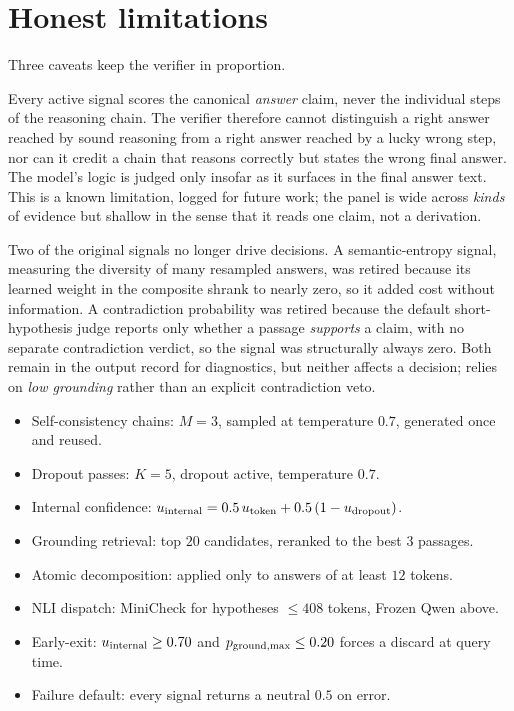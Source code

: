 \section{Honest limitations}
\label{sec:verifier-retired}

Three caveats keep the verifier in proportion.

\begin{pitfall}
Every active signal scores the canonical \emph{answer} claim, never the individual
steps of the reasoning chain. The verifier therefore cannot distinguish a right
answer reached by sound reasoning from a right answer reached by a lucky wrong step,
nor can it credit a chain that reasons correctly but states the wrong final answer.
The model's logic is judged only insofar as it surfaces in the final answer text.
This is a known limitation, logged for future work; the panel is wide across
\emph{kinds} of evidence but shallow in the sense that it reads one claim, not a
derivation.
\end{pitfall}

\begin{pitfall}
Two of the original signals no longer drive decisions. A semantic-entropy signal,
measuring the diversity of many resampled answers, was retired because its learned
weight in the composite shrank to nearly zero, so it added cost without information.
A contradiction probability was retired because the default short-hypothesis judge
reports only whether a passage \emph{supports} a claim, with no separate
contradiction verdict, so the signal was structurally always zero. Both remain in
the output record for diagnostics, but neither affects a decision; \caem{} relies on
\emph{low grounding} rather than an explicit contradiction veto.
\end{pitfall}

\begin{bythenumbers}
\begin{itemize}[leftmargin=1.3em, itemsep=1pt]
  \item Self-consistency chains: $M = 3$, sampled at temperature $0.7$, generated once and reused.
  \item Dropout passes: $K = 5$, dropout active, temperature $0.7$.
  \item Internal confidence: $u_{\text{internal}} = 0.5\,u_{\text{token}} + 0.5\,(1-u_{\text{dropout}})$.
  \item Grounding retrieval: top $20$ candidates, reranked to the best $3$ passages.
  \item Atomic decomposition: applied only to answers of at least $12$ tokens.
  \item NLI dispatch: MiniCheck for hypotheses $\le 408$ tokens, Frozen Qwen above.
  \item Early-exit: $u_{\text{internal}} \ge 0.70$ and $p_{\text{ground,max}} \le 0.20$ forces a discard at query time.
  \item Failure default: every signal returns a neutral $0.5$ on error.
\end{itemize}
\end{bythenumbers}

